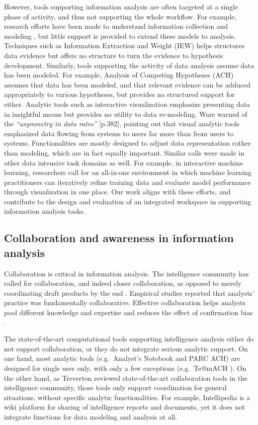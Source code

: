 However, tools supporting information analysis are often targeted at a single phase of activity, and thus not supporting the whole workflow. For example, research efforts have been made to understand information collection and modeling \cite{Shah2014i, Jansen2010c}, but little support is provided to extend these models to analysis. Techniques such as Information Extraction and Weight (IEW) helps structures data evidence but offers no structure to turn the evidence to hypothesis development. Similarly, tools supporting the activity of data analysis assume data has been modeled. For example,  Analysis of Competing Hypotheses (ACH) assumes that data has
been modeled, and that relevant evidence can be adduced appropriately to various
hypotheses, but provides no structured support for either. Analytic tools such as interactive visualization emphasize presenting data in insightful means but provides no utility to data re-modeling. Ware
\cite{Ware2012} warned of the \emph{``asymmetry in data rates''} [p.382],
pointing out that visual analytic tools emphasized data flowing from systems to
users far more than from users to systems. Functionalities are mostly designed
to adjust data representation rather than modeling, which are in fact equally
important. Similar calls were made in other data intensive task domains as well. For
example, in interactive machine learning, researchers \cite{Chen2016,
Amershi2015} call for an all-in-one environment in which machine learning
practitioners can iteratively refine training data and evaluate model performance through
visualization in one place. Our work aligns with these efforts, and contribute to the design and
evaluation of an integrated workspace in supporting information analysis tasks.

\subsection{Collaboration and awareness in information analysis}

Collaboration is critical in information analysis. The intelligence community has called for collaboration, and indeed closer collaboration, as opposed to merely coordinating draft products by the end \cite{Vision2015}. Empirical studies \cite{Chin2009,Kang2011} reported that analysts' practice was fundamentally collaborative. Effective collaboration helps analysts pool different knowledge and expertise and reduces the effect of confirmation bias \cite{Heuer1999}.

The state-of-the-art computational tools supporting intelligence analysis either
do not support collaboration, or they do not integrate serious analytic
support. On one hand, most analytic tools (e.g.~Analyst's Notebook and PARC ACH)
are designed for single user only, with only a few exceptions (e.g.~Te@mACH
\cite{Globalytica2017}). On the other hand, as Treverton \cite{Treverton2016}
reviewed state-of-the-art collaboration tools in the intelligence community, those
tools only support coordination for general situations, without specific analytic functionalities. For example, Intellipedia
\cite{Intelink2017} is a wiki platform for sharing of intelligence reports and
documents, yet it does not integrate functions for data modeling and analysis at all.

